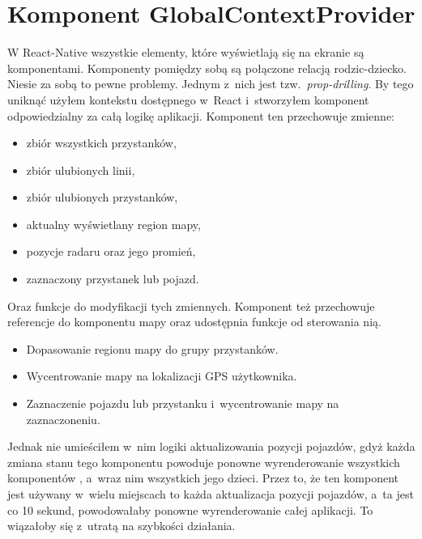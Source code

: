 \documentclass{SGGW-thesis}
\begin{document}
\section{Komponent GlobalContextProvider}
W React-Native wszystkie elementy, które wyświetlają się na ekranie są komponentami.
Komponenty pomiędzy sobą są połączone relacją rodzic-dziecko.
Niesie za sobą to pewne problemy.
Jednym z~nich jest tzw.~\textit{prop-drilling}. %
By tego uniknąć użyłem kontekstu dostępnego w~React i~stworzyłem komponent  odpowiedzialny za całą logikę aplikacji.
Komponent ten przechowuje zmienne:
\begin{itemize}
  \item{zbiór wszystkich przystanków,}
  \item{zbiór ulubionych linii,}
  \item{zbiór ulubionych przystanków,}
  \item{aktualny wyświetlany region mapy,}
  \item{pozycje radaru oraz jego promień,}
  \item{zaznaczony przystanek lub pojazd.}
\end{itemize}
Oraz funkcje do modyfikacji tych zmiennych. %
Komponent też przechowuje referencje do komponentu mapy oraz udostępnia funkcje od sterowania nią.
\begin{itemize}
  \item{Dopasowanie regionu mapy do grupy przystanków.}
  \item{Wycentrowanie mapy na lokalizacji GPS użytkownika.}
  \item{Zaznaczenie pojazdu lub przystanku i~wycentrowanie mapy na zaznaczoneniu.}
\end{itemize}

Jednak nie umieściłem w~nim logiki aktualizowania pozycji pojazdów, gdyż każda zmiana stanu
tego komponentu powoduje ponowne wyrenderowanie wszystkich komponentów , a~wraz nim wszystkich jego dzieci.
Przez to, że ten komponent jest używany w~wielu miejscach to każda aktualizacja pozycji pojazdów, a~ta
jest co 10 sekund, powodowałaby ponowne wyrenderowanie całej aplikacji.
To wiązałoby się z~utratą na szybkości działania.
\end{document}
